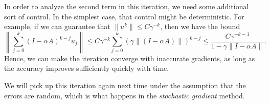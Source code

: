 \documentclass[12pt, leqno]{article} %
\begin{document}
In order to analyze the second term in this iteration, we need some
additional sort of control.  In the simplest case, that control might
be deterministic.  For example, if we can guarantee that
$\|u^k\| \leq C \gamma^{-k}$, then we have the bound
\[
  \left\| \sum_{j=0}^k  (I-\alpha A)^{k-j} u_j \right\| \leq
  C \gamma^{-k} \sum_{j=0}^k \left( \gamma \|(I-\alpha A)\|\right)^{k-j} \leq
  \frac{C \gamma^{-k-1}}{1-\gamma \|I-\alpha A\|}.
\]
Hence, we can make the iteration converge with inaccurate gradients,
as long as the accuracy improves sufficiently quickly with time.

We will pick up this iteration again next time under the assumption
that the errors are random, which is what happens in the
{\em stochastic gradient} method.
\end{document}
